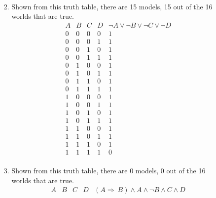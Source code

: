 \documentclass[letterpaper, 12pt]{article}
\begin{document}
\begin{enumerate}
\begin{enumerate}
\begin{enumerate}
\begin{displaymath}
\begin{array}{|c|c|c|c|c|}
                            \end{array}
                        \end{displaymath}
                    \item Shown from this truth table, there are 15 models, 
                    15 out of the 16 worlds that are true.
                    \begin{displaymath}
                        \begin{array}{|c|c|c|c|c|}
                            A & B & C & D & \lnot A \lor \lnot B \lor \lnot C \lor \lnot D\\
                            \hline
                            0 & 0 & 0 & 0 & 1\\
                            0 & 0 & 0 & 1 & 1\\
                            0 & 0 & 1 & 0 & 1\\
                            0 & 0 & 1 & 1 & 1\\
                            0 & 1 & 0 & 0 & 1\\
                            0 & 1 & 0 & 1 & 1\\
                            0 & 1 & 1 & 0 & 1\\
                            0 & 1 & 1 & 1 & 1\\
                            1 & 0 & 0 & 0 & 1\\
                            1 & 0 & 0 & 1 & 1\\
                            1 & 0 & 1 & 0 & 1\\
                            1 & 0 & 1 & 1 & 1\\
                            1 & 1 & 0 & 0 & 1\\
                            1 & 1 & 0 & 1 & 1\\
                            1 & 1 & 1 & 0 & 1\\
                            1 & 1 & 1 & 1 & 0\\
                        \end{array}
                    \end{displaymath}
                    \item Shown from this truth table, there are 0 models, 
                    0 out of the 16 worlds that are true.
                    \begin{displaymath}
                        \begin{array}{|c|c|c|c|c|}
                            A & B & C & D &  (A \Longrightarrow\ B) \land A \land \lnot B \land C \land D\\

\end{array}
\end{displaymath}
\end{enumerate}
\end{enumerate}
\end{enumerate}
\end{document}
